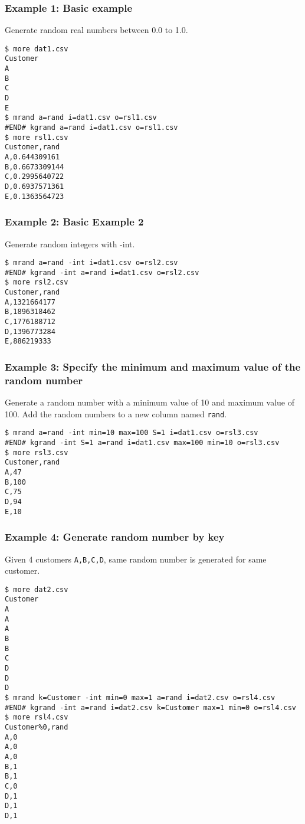 \subsubsection*{Example 1: Basic example}

Generate random real numbers between 0.0 to 1.0.


\begin{Verbatim}[baselinestretch=0.7,frame=single]
$ more dat1.csv
Customer
A
B
C
D
E
$ mrand a=rand i=dat1.csv o=rsl1.csv
#END# kgrand a=rand i=dat1.csv o=rsl1.csv
$ more rsl1.csv
Customer,rand
A,0.644309161
B,0.6673309144
C,0.2995640722
D,0.6937571361
E,0.1363564723
\end{Verbatim}
\subsubsection*{Example 2: Basic Example 2}

Generate random integers with -int.


\begin{Verbatim}[baselinestretch=0.7,frame=single]
$ mrand a=rand -int i=dat1.csv o=rsl2.csv
#END# kgrand -int a=rand i=dat1.csv o=rsl2.csv
$ more rsl2.csv
Customer,rand
A,1321664177
B,1896318462
C,1776188712
D,1396773284
E,886219333
\end{Verbatim}
\subsubsection*{Example 3: Specify the minimum and maximum value of the random number}

Generate a random number with a minimum value of 10 and maximum value of 100. Add the random numbers to a new column named \verb|rand|.


\begin{Verbatim}[baselinestretch=0.7,frame=single]
$ mrand a=rand -int min=10 max=100 S=1 i=dat1.csv o=rsl3.csv
#END# kgrand -int S=1 a=rand i=dat1.csv max=100 min=10 o=rsl3.csv
$ more rsl3.csv
Customer,rand
A,47
B,100
C,75
D,94
E,10
\end{Verbatim}
\subsubsection*{Example 4: Generate random number by key}

Given 4 customers \verb|A,B,C,D|, same random number is generated for same customer.


\begin{Verbatim}[baselinestretch=0.7,frame=single]
$ more dat2.csv
Customer
A
A
A
B
B
C
D
D
D
$ mrand k=Customer -int min=0 max=1 a=rand i=dat2.csv o=rsl4.csv
#END# kgrand -int a=rand i=dat2.csv k=Customer max=1 min=0 o=rsl4.csv
$ more rsl4.csv
Customer%0,rand
A,0
A,0
A,0
B,1
B,1
C,0
D,1
D,1
D,1
\end{Verbatim}
